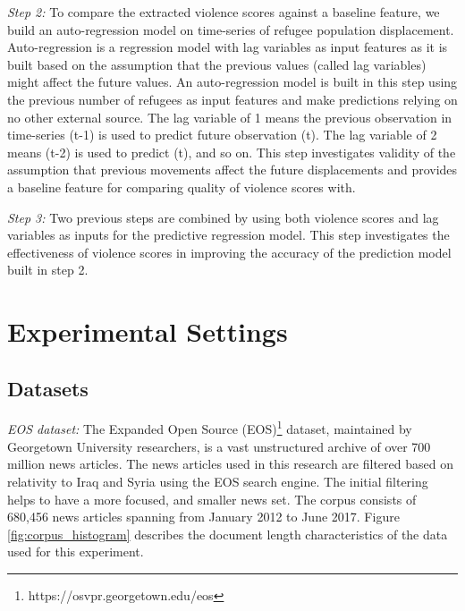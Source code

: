 \textit{Step 2:} To compare the extracted violence scores against a baseline feature, we build an auto-regression model on time-series of refugee population displacement. Auto-regression is a regression model with lag variables as input features as it is built based on the assumption that the previous values (called lag variables) might affect the future values. An auto-regression model is built in this step using the previous number of refugees as input features and make predictions relying on no other external source. The lag variable of 1 means the previous observation in time-series (t-1) is used to predict future observation (t). The lag variable of 2 means (t-2) is used to predict (t), and so on. 
This step investigates validity of the assumption that previous movements affect the future displacements and provides a baseline feature for comparing quality of violence scores with.

\textit{Step 3:} Two previous steps are combined by using both violence scores and lag variables as inputs for the predictive regression model. This step investigates the effectiveness of violence scores in improving the accuracy of the prediction model built in step 2.

\section{Experimental Settings}

\subsection{Datasets}
\textit{EOS dataset:}
The Expanded Open Source (EOS)\footnote{https://osvpr.georgetown.edu/eos} dataset, maintained by Georgetown University researchers, is a vast unstructured archive of over 700 million news articles. The news articles used in this research are filtered based on relativity to Iraq and Syria using the EOS search engine. The initial filtering helps to have a more focused, and smaller news set. The corpus consists of 680,456 news articles spanning from January 2012 to June 2017. Figure \ref{fig:corpus_histogram} describes the document length characteristics of the data used for this experiment.

